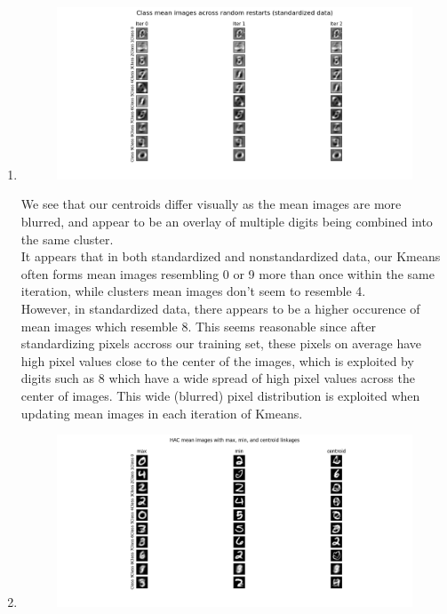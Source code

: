 \documentclass[submit]{harvardml}
\begin{document}
\begin{enumerate}
    \newpage
    \item 
    \begin{figure}[h!]
            \centering
            \includegraphics[height=0.4\textheight]{HW4/P1KmeansStandard.png}
        \end{figure}
    We see that our centroids differ visually as the mean images are more blurred, and appear to be an overlay of multiple digits being combined into the same cluster. 
    \\ It appears that in both standardized and nonstandardized data, our Kmeans often forms mean images resembling 0 or 9 more than once within the same iteration, while clusters mean images don't seem to resemble 4. 
    \\ However, in standardized data, there appears to be a higher occurence of mean images which resemble 8. This seems reasonable since after standardizing pixels accross our training set, these pixels on average have high pixel values close to the center of the images, which is exploited by digits such as 8 which have a wide spread of high pixel values across the center of images. This wide (blurred) pixel distribution is exploited when updating mean images in each iteration of Kmeans.  
    \newpage
    \item 
    \begin{figure}[h!]
            \centering
            \includegraphics[height=0.4\textheight]{HW4/HAC_part4.png}

\end{figure}
\end{enumerate}
\end{document}
